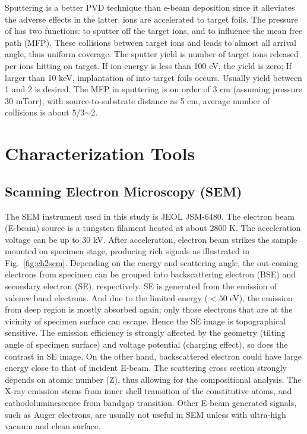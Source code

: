 Sputtering is a better PVD technique than e-beam deposition since it alleviates the adverse effects in the latter.  ions are accelerated to target foils. The pressure of  has two functions: to sputter off the target ions, and to influence the mean free path (MFP). These collisions between target ions and  leads to almost all arrival angle, thus uniform coverage. The sputter yield is number of target ions released per ions hitting on target. If  ion energy is less than 100 eV, the yield is zero; If larger than 10 keV, implantation of  into target foils occurs. Usually yield between 1 and 2 is desired. The MFP in sputtering is on order of 3 cm (assuming pressure 30 mTorr), with source-to-substrate distance as 5 cm, average number of collisions is about 5/3$\sim$2. 

\section{Characterization Tools}
\subsection{Scanning Electron Microscopy (SEM)}\label{sec:sem}

The SEM instrument used in this study is JEOL JSM-6480. The electron beam (E-beam) source is a tungsten filament heated at about 2800 K. The acceleration voltage can be up to 30 kV. After acceleration, electron beam strikes the sample mounted on specimen stage, producing rich signals as illustrated in Fig.~\ref{fig:ch2sem}. Depending on the energy and scattering angle, the out-coming electrons from specimen can be grouped into backscattering electron (BSE) and secondary electron (SE), respectively. SE is generated from the emission of valence band electrons. And due to the limited energy ($<50$ eV), the emission from deep region is mostly absorbed again; only those electrons that are at the vicinity of specimen surface can escape. Hence the SE image is topographical sensitive. The emission efficiency is strongly affected by the geometry (tilting angle of specimen surface) and voltage potential (charging effect), so does the contrast in SE image. On the other hand, backscattered electron could have large energy close to that of incident E-beam. The scattering cross section strongly depends on atomic number (Z), thus allowing for the compositional analysis. The X-ray emission stems from inner shell transition of the constitutive atoms, and cathodoluminescence from bandgap transition. Other E-beam generated signals, such as Auger electrons, are usually not useful in SEM unless with ultra-high vacuum and clean surface.

